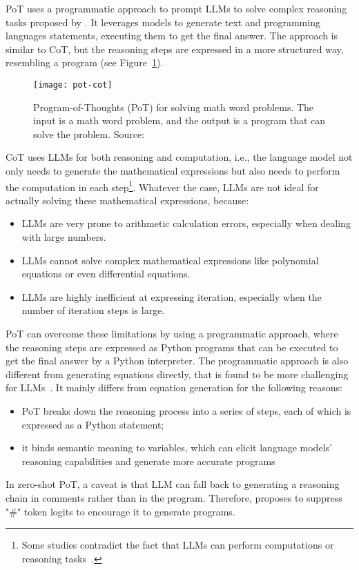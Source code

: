 PoT uses a programmatic approach to prompt LLMs to solve complex reasoning tasks proposed by \textcite{chen2022program}.
It leverages models to generate text and programming languages statements, executing them to get the final answer.
The approach is similar to CoT, but the reasoning steps are expressed in a more structured way, resembling a program (see Figure~\ref{fig:pot-cot}).
\begin{figure}
	\centering
	\texttt{[image: pot-cot]}
	\caption{Program-of-Thoughts (PoT) for solving math word problems. The input is a math word problem, and the output is a program that can solve the problem. Source: \textcite{chen2022program}}
	\label{fig:pot-cot}
\end{figure}
CoT uses LLMs for both reasoning and computation, i.e., the language model not only needs to generate the mathematical expressions but also needs to perform the computation in each step\footnote{
	Some studies contradict the fact that LLMs can perform computations or reasoning tasks~\cite{qian2022limitations, bian2024chatgpt, kambhampati2023role}.
}.
Whatever the case, LLMs are not ideal for actually solving these mathematical expressions, because:
\begin{itemize}
	\item LLMs are very prone to arithmetic calculation errors, especially when dealing with large numbers.
	\item LLMs cannot solve complex mathematical expressions like polynomial equations or even differential equations.
	\item LLMs are highly inefficient at expressing iteration, especially when the number of iteration steps is large.
\end{itemize}
PoT can overcome these limitations by using a programmatic approach, where the reasoning steps are expressed as Python programs that can be executed to get the final answer by a Python interpreter.
The programmatic approach is also different from generating equations directly, that is found to be more challenging for LLMs~\cite{wei2022chain}.
It mainly differs from equation generation for the following reasons:
\begin{itemize}
	\item PoT breaks down the reasoning process into a series of steps, each of which is expressed as a Python statement;
	\item it binds semantic meaning to variables, which can elicit language models' reasoning capabilities and generate more accurate programs
\end{itemize}
In zero-shot PoT, a caveat is that LLM can fall back to generating a reasoning chain in comments rather than in the program.
Therefore, \textcite{chen2022program} proposes to suppress "\#" token logits to encourage it to generate programs.

